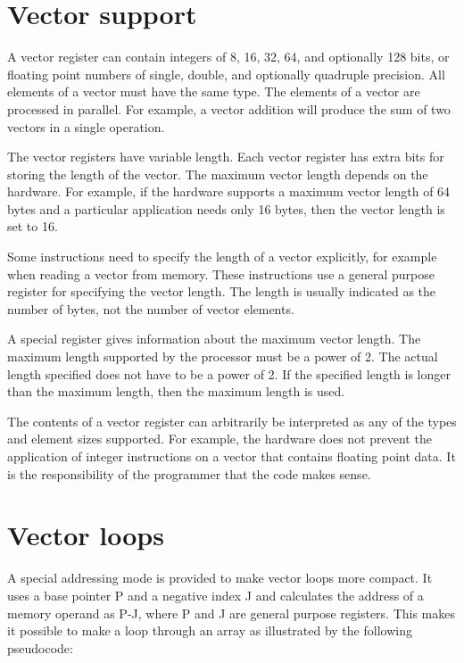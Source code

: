 \documentclass[forwardcom.tex]{subfiles}
\begin{document}
\section{Vector support}
A vector register can contain integers of 8, 16, 32, 64, and optionally 128 bits, or floating point numbers of single, double, and optionally quadruple precision. All elements of a vector must have the same type. The elements of a vector are processed in parallel. For example, a vector addition will produce the sum of two vectors in a single operation.
\vspace{2mm}

The vector registers have variable length. Each vector register has extra bits for storing the length of the vector. The maximum vector length depends on the hardware. 
For example, if the hardware supports a maximum vector length of 64 bytes and a particular application needs only 16 bytes, then the vector length is set to 16.
\vspace{2mm}

Some instructions need to specify the length of a vector explicitly, for example when reading a vector from memory. These instructions use a general purpose register for specifying the vector length. The length is usually indicated as the number of bytes, not the number of vector elements.
\vspace{2mm}

A special register gives information about the maximum vector length. The maximum length supported by the processor must be a power of 2. The actual length specified does not have to be a power of 2. If the specified length is longer than the maximum length, then the maximum length is used.
\vspace{2mm}

The contents of a vector register can arbitrarily be interpreted as any of the types and element sizes supported. For example, the hardware does not prevent the application of integer instructions on a vector that contains floating point data. It is the responsibility of the programmer that the code makes sense.

\section{Vector loops} \label{vectorLoops}
A special addressing mode is provided to make vector loops more compact. It uses a base pointer P and a negative index J and calculates the address of a memory operand as P-J, where P and J are general purpose registers. This makes it possible to make a loop through an array as illustrated by the following pseudocode:
\end{document}
